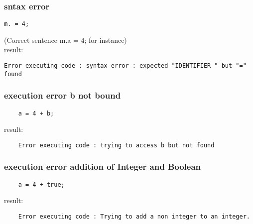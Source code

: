 \documentclass{eplDoc}
\begin{document}
\subsubsection{sntax error}
\begin{lstlisting}
m. = 4;   
\end{lstlisting}
(Correct sentence m.a = 4; for instance) \\
result:
\begin{lstlisting}
Error executing code : syntax error : expected "IDENTIFIER " but "=" found
\end{lstlisting}
\subsubsection{execution error b not bound}
\begin{lstlisting}
    a = 4 + b;
\end{lstlisting}
result:
\begin{lstlisting}
    Error executing code : trying to access b but not found
\end{lstlisting}
\subsubsection{execution error addition of Integer and Boolean}
\begin{lstlisting}
    a = 4 + true;
\end{lstlisting}
result:
\begin{lstlisting}
    Error executing code : Trying to add a non integer to an integer.
\end{lstlisting}
\end{document}
